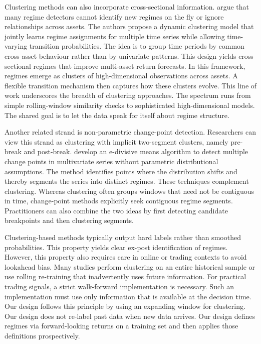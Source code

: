 Clustering methods can also incorporate cross-sectional information. \cite{10.1007/978-3-031-12426-6_1} argue that many regime detectors cannot identify new regimes on the fly or ignore relationships across assets. The authors propose a dynamic clustering model that jointly learns regime assignments for multiple time series while allowing time-varying transition probabilities. The idea is to group time periods by common cross-asset behaviour rather than by univariate patterns. This design yields cross-sectional regimes that improve multi-asset return forecasts. In this framework, regimes emerge as clusters of high-dimensional observations across assets. A flexible transition mechanism then captures how these clusters evolve. This line of work underscores the breadth of clustering approaches. The spectrum runs from simple rolling-window similarity checks to sophisticated high-dimensional models. The shared goal is to let the data speak for itself about regime structure.

Another related strand is non-parametric change-point detection. Researchers can view this strand as clustering with implicit two-segment clusters, namely pre-break and post-break. \cite{Matteson2014} develop an e-divisive means algorithm to detect multiple change points in multivariate series without parametric distributional assumptions. The method identifies points where the distribution shifts and thereby segments the series into distinct regimes. These techniques complement clustering. Whereas clustering often groups windows that need not be contiguous in time, change-point methods explicitly seek contiguous regime segments. Practitioners can also combine the two ideas by first detecting candidate breakpoints and then clustering segments.

Clustering-based methods typically output hard labels rather than smoothed probabilities. This property yields clear ex-post identification of regimes. However, this property also requires care in online or trading contexts to avoid lookahead bias. Many studies perform clustering on an entire historical sample or use rolling re-training that inadvertently uses future information. For practical trading signals, a strict walk-forward implementation is necessary. Such an implementation must use only information that is available at the decision time. Our design follows this principle by using an expanding window for clustering. Our design does not re-label past data when new data arrives. Our design defines regimes via forward-looking returns on a training set and then applies those definitions prospectively.

